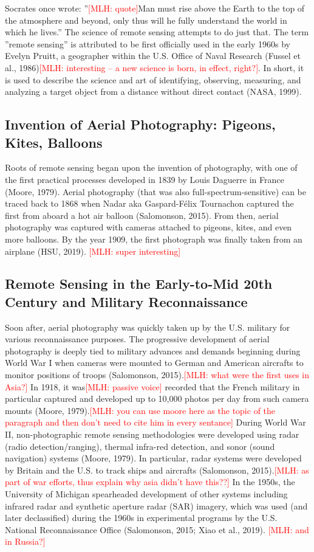 \documentclass{book}\usepackage{knitr}
\newcommand{\red}[1]{\textcolor{red}{[MLH: #1]}}
\begin{document}
Socrates once wrote: ''\red{quote}Man must rise above the Earth to the top of the atmosphere and beyond, only thus will he fully understand the world in which he lives.'' The science of remote sensing attempts to do just that. The term ''remote sensing'' is attributed to be first officially used in the early 1960s by Evelyn Pruitt, a geographer within the U.S. Office of Naval Research (Fussel et al., 1986)\red{interesting -- a new science is born, in effect, right?}. In short, it is used to describe the science and art of identifying, observing, measuring, and analyzing a target object from a distance without direct contact (NASA, 1999). 

\subsection{Invention of Aerial Photography: Pigeons, Kites, Balloons}

Roots of remote sensing began upon the invention of photography, with one of the first practical processes developed in 1839 by Louis Daguerre in France (Moore, 1979). Aerial photography (that was also full-spectrum-sensitive) can be traced back to 1868 when Nadar aka Gaspard-Félix Tournachon captured the first from aboard a hot air balloon (Salomonson, 2015). From then, aerial photography was captured with cameras attached to pigeons, kites, and even more balloons. By the year 1909, the first photograph was finally taken from an airplane (HSU, 2019). \red{super interesting}

\subsection{Remote Sensing in the Early-to-Mid 20th Century and Military Reconnaissance}

Soon after, aerial photography was quickly taken up by the U.S. military for various reconnaissance purposes. The progressive development of aerial photography is deeply tied to military advances and demands beginning during World War I when cameras were mounted to German and American aircrafts to monitor positions of troops (Salomonson, 2015).\red{what were the first uses in Asia?} In 1918, it was\red{passive voice} recorded that the French military in particular captured and developed up to 10,000 photos per day from such camera mounts (Moore, 1979).\red{you can use moore here as the topic of the paragraph and then don't need to cite him in every sentance} During World War II, non-photographic remote sensing methodologies were developed using radar (radio detection/ranging), thermal infra-red detection, and sonor (sound navigation) systems (Moore, 1979). In particular, radar systems were developed by Britain and the U.S. to track ships and aircrafts (Salomonson, 2015).\red{as part of war efforts, thus explain why asia didn't have this??} In the 1950s, the University of Michigan spearheaded development of other systems including infrared radar and synthetic aperture radar (SAR) imagery, which was used (and later declassified) during the 1960s in experimental programs by the U.S. National Reconnaissance Office (Salomonson, 2015; Xiao et al., 2019). \red{and in Russia?}
\end{document}
